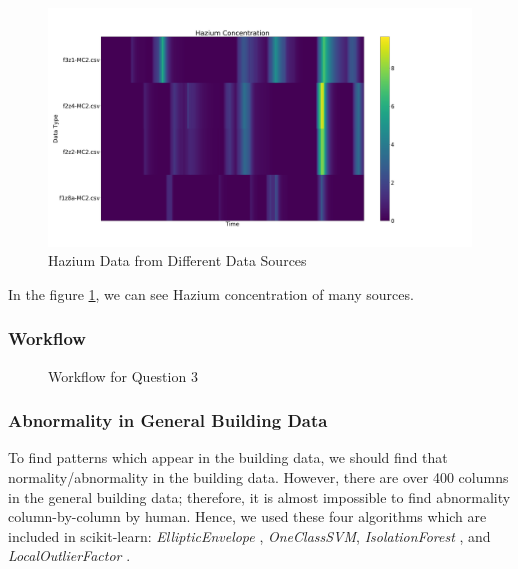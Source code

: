 \documentclass[aps, 10pt, a4paper]{article}
\begin{document}
                \begin{figure}[htbp]
                    \centering
                    \includegraphics[width=0.4 \linewidth]{figures/hazium.png}
                    \caption{Hazium Data from Different Data Sources}
                    \label{fig:generalhazium}
                \end{figure}
            
                In the figure \ref{fig:generalhazium}, we can see Hazium concentration of many sources. 

            \subsubsection{Workflow}
                \begin{figure}[htbp]
                    \centering
                    \begin{tikzpicture}[node distance = 2cm, auto]
                    \end{tikzpicture}
                    \caption{Workflow for Question 3}
                    \label{fig:workflow3}
                \end{figure}
            
            \subsubsection{Abnormality in General Building Data}       
                To find patterns which appear in the building data, we should find that normality/abnormality in the building data. However, there are over 400 columns in the general building data; therefore, it is almost impossible to find abnormality column-by-column by human. Hence, we used these four algorithms which are included in scikit-learn: \textit{EllipticEnvelope} \cite{ref:normal1}, \textit{OneClassSVM}, \textit{IsolationForest} \cite{ref:normal2, ref:normal3}, and \textit{LocalOutlierFactor} \cite{ref:normal4}.
                
\end{document}
